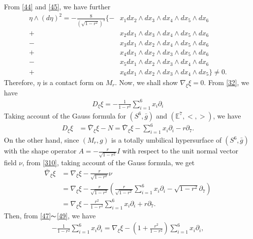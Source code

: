 \documentclass[12pt]{article}
\numberwithin{equation}{section}
\begin{document}
From \eqref{44} and \eqref{45}, we have further
\begin{equation}\label{46}
\begin{split}
\eta \wedge (d\eta)^2 =-\frac{8}{(\sqrt{1-r^2})^3}
\{-&x_1dx_2\wedge dx_3\wedge dx_4\wedge dx_5\wedge dx_6\\
+&x_2dx_1\wedge dx_3\wedge dx_4\wedge dx_5\wedge dx_6\\
-&x_3dx_1\wedge dx_2\wedge dx_4\wedge dx_5\wedge dx_6\\
+&x_4dx_1\wedge dx_2\wedge dx_3\wedge dx_5\wedge dx_6\\
-&x_5dx_1\wedge dx_2\wedge dx_3\wedge dx_4\wedge dx_6\\
+&x_6dx_1\wedge dx_2\wedge dx_3\wedge dx_4\wedge dx_5 \}\neq 0.
\end{split}
\end{equation}
Therefore, $\eta$ is a contact form on $M_{r}$. Now, we shall
show $\nabla_{\xi}\xi=0$. From \eqref{32}, we have
\begin{equation}\label{47}
\begin{split}
D_{\xi}\xi=-\frac{1}{1-r^2}\sum_{i=1}^{6}x_i\partial_i
\end{split}
\end{equation}
Taking account of the Gauss formula for $(S^6, \bar{g})$ and $(\mathbb{E}^7,<,
>)$, we have
\begin{equation}\label{48}
\begin{split}
D_{\xi}\xi&=\bar{\nabla}_{\xi}\xi-N =\bar{\nabla}_{\xi}\xi-\sum_{i=1}^6 x_i\partial_i-r\partial_7.
\end{split}
\end{equation}
On the other hand, since $(M_{r}, g)$ is a totally umbilical
hypersurface of $(S^6, \bar{g})$ with the shape operator
$A=-\frac{r}{\sqrt{1-r^2}}{I}$ with respect to the unit normal vector field
$\nu$, from \eqref{310}, taking account of the Gauss formula, we get
\begin{equation}\label{49}
\begin{split}
\bar{\nabla}_{\xi}\xi
&={\nabla}_{\xi}\xi-\frac{r}{\sqrt{1-r^2}}\nu\\
&={\nabla}_{\xi}\xi-\frac{r}{\sqrt{1-r^2}}(\frac{r}{\sqrt{1-r^2}}\sum_{i=1}^6
x_i\partial_i-\sqrt{1-r^2}\partial_7)\\
&={\nabla}_{\xi}\xi-{\frac{r^2}{1-r^2}}\sum_{i=1}^6
x_i\partial_i+r\partial_7.
\end{split}
\end{equation}
Then, from \eqref{47}$\thicksim$\eqref{49}, we have
\begin{equation*}
\begin{split}
-\frac{1}{1-r^2}\sum_{i=1}^6
x_i\partial_i=\nabla_{\xi}\xi-(1+\frac{r^2}{1-r^2})\sum_{i=1}^6
x_i\partial_i,
\end{split}
\end{equation*}
\end{document}
